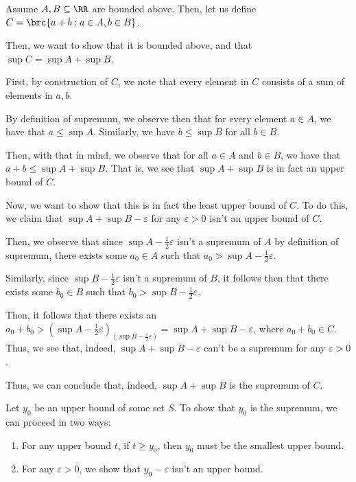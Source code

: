 \documentclass[openany]{book}
\begin{document}
\begin{hw}
	Assume $A, B \subseteq \RR$ are bounded above. Then, let us define $C = \brc{a + b : a \in A, b \in B}$.
	
	Then, we want to show that it is bounded above, and that $\sup C = \sup A + \sup B$.
\end{hw}
\begin{solution}
	First, by construction of $C$, we note that every element in $C$ consists of a sum of elements in $a, b$.
	
	By definition of supremum, we observe then that for every element $a \in A$, we have that $a \leq \sup A$. Similarly, we have $b \leq \sup B$ for all $b \in B$.
	
	Then, with that in mind, we observe that for all $a \in A$ and $b \in B$, we have that $a + b \leq \sup A + \sup B$. That is, we see that $\sup A + \sup B$ is in fact an upper bound of $C$.
	
	Now, we want to show that this is in fact the least upper bound of $C$. To do this, we claim that $\sup A + \sup B - \varepsilon$ for any $\varepsilon > 0$ isn't an upper bound of $C$.
	
	Then, we observe that since $\sup A - \frac{1}{2} \varepsilon$ isn't a supremum of $A$ by definition of supremum, there exists some $a_0 \in A$ such that $a_0 > \sup A - \frac{1}{2}\varepsilon$.
	
	Similarly, since $\sup B - \frac{1}{2}\varepsilon$ isn't a supremum of $B$, it follows then that there exists some $b_0 \in B$ such that $b_0 > \sup B - \frac{1}{2} \varepsilon$.
	
	Then, it follows that there exists an $a_0 + b_0 > (\sup A - \frac{1}{2}\varepsilon) _ (\sup B - \frac{1}{2} \varepsilon) = \sup A + \sup B - \varepsilon$, where $a_0 + b_0 \in C$. Thus, we see that, indeed, $\sup A + \sup B - \varepsilon$ can't be a supremum for any $\varepsilon > 0$.
	
	Thus, we can conclude that, indeed, $\sup A + \sup B$ is the supremum of $C$.
\end{solution}

\begin{rmk}
	Let $y_0$ be an upper bound of some set $S$. To show that $y_0$ is the supremum, we can proceed in two ways:
	\begin{enumerate}
		\item For any upper bound $t$, if $t \geq y_0$, then $y_0$ must be the smallest upper bound.
		\item For any $\varepsilon > 0$, we show that $y_0 - \varepsilon$ isn't an upper bound.
	\end{enumerate}
\end{rmk}
\end{document}
